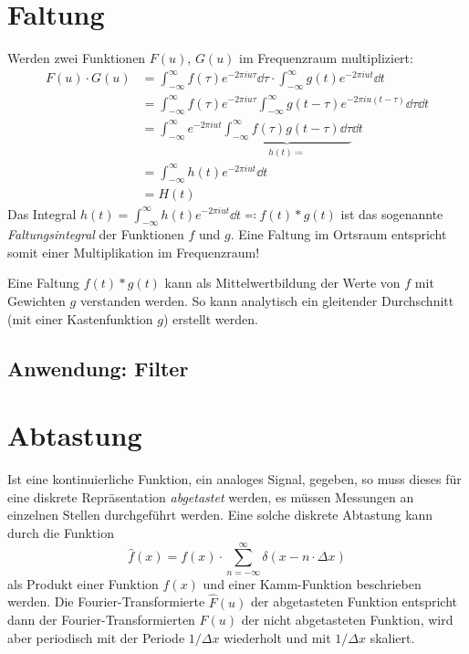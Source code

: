 	\section{Faltung}
		Werden zwei Funktionen \( F(u) \), \( G(u) \) im Frequenzraum multipliziert:
		\begin{align*}
			F(u) \cdot G(u)
			 & = \int_{-\infty}^{\infty} \! f(\tau) e^{-2\pi i u \tau} \dd{\tau} \cdot \int_{-\infty}^{\infty} \! g(t) e^{-2\pi i u t} \dd{t}             \\
			 & = \int_{-\infty}^{\infty} \! f(\tau) e^{-2\pi i u \tau} \int_{-\infty}^{\infty} \! g(t - \tau) e^{-2\pi i u (t - \tau)} \dd{\tau} \dd{t}   \\
			 & = \int_{-\infty}^{\infty} \! e^{-2\pi i u t} \underbrace{\int_{-\infty}^{\infty} \! f(\tau) g(t - \tau) \dd{\tau}}_{h(t) \coloneqq} \dd{t} \\
			 & = \int_{-\infty}^{\infty} \! h(t) e^{-2\pi i u t} \dd{t}                                                                                   \\
			 & = H(t)
		\end{align*}
		Das Integral \( h(t) = \int_{-\infty}^{\infty} \! h(t) e^{-2\pi i u t} \dd{t} \eqqcolon f(t) \ast g(t) \) ist das sogenannte \emph{Faltungsintegral} der Funktionen \(f\) und \(g\). Eine Faltung im Ortsraum entspricht somit einer Multiplikation im Frequenzraum!

		Eine Faltung \( f(t) \ast g(t) \) kann als Mittelwertbildung der Werte von \(f\) mit Gewichten \(g\) verstanden werden. So kann \bspw analytisch ein gleitender Durchschnitt (mit einer Kastenfunktion \(g\)) erstellt werden.

		\subsection{Anwendung: Filter} %

	\section{Abtastung}
		Ist eine kontinuierliche Funktion, \bzw ein analoges Signal, gegeben, so muss dieses für eine diskrete Repräsentation \emph{abgetastet} werden, \dh es müssen Messungen an einzelnen Stellen durchgeführt werden. Eine solche diskrete Abtastung kann durch die Funktion
		\begin{equation*}
			\hat{f}(x) = f(x) \cdot \sum_{n = -\infty}^{\infty} \delta(x - n \cdot \Delta x)
		\end{equation*}
		\dh als Produkt einer Funktion \( f(x) \) und einer Kamm-Funktion beschrieben werden. Die Fourier-Transformierte \( \hat{F}(u) \) der abgetasteten Funktion entspricht dann der Fourier-Transformierten \( F(u) \) der nicht abgetasteten Funktion, wird aber periodisch mit der Periode \( 1/\Delta x \) wiederholt und mit \( 1/\Delta x \) skaliert.

